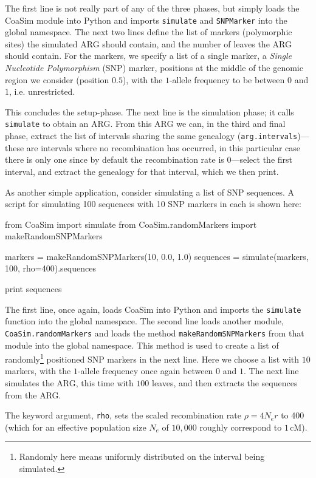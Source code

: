 \documentclass{manual}
\newcommand{\cM}{\mathrm{cM}}
\begin{document}
The first line is not really part of any of the three phases, but
simply loads the CoaSim module into Python and imports
\texttt{simulate} and \texttt{SNPMarker} into the global namespace.
The next two lines define the list of markers (polymorphic sites) the
simulated ARG should contain, and the number of leaves the ARG should
contain.  For the markers, we specify a list of a single marker, a
\emph{Single Nucleotide Polymorphism} (SNP) marker, positions at the
middle of the genomic region we consider (position $0.5$), with the
$1$-allele frequency to be between $0$ and $1$, i.e. unrestricted.

This concludes the setup-phase.  The next line is the simulation
phase; it calls \texttt{simulate} to obtain an ARG.  From this ARG we
can, in the third and final phase, extract the list of intervals
sharing the same genealogy (\texttt{arg.intervals})---these are
intervals where no recombination has occurred, in this particular case
there is only one since by default the recombination rate is
$0$---select the first interval, and extract the genealogy for that
interval, which we then print.

As another simple application, consider simulating a list of SNP
sequences.  A script for simulating 100 sequences with 10 SNP markers
in each is shown here:
\begin{code}
from CoaSim import simulate
from CoaSim.randomMarkers import makeRandomSNPMarkers

markers = makeRandomSNPMarkers(10, 0.0, 1.0)
sequences = simulate(markers, 100, rho=400).sequences

print sequences
\end{code}

The first line, once again, loads CoaSim into Python and imports the
\texttt{simulate} function into the global namespace.  The second line
loads another module, \texttt{CoaSim.randomMarkers} and loads the
method \texttt{makeRandomSNPMarkers} from that module into the global
namespace.  This method is used to create a list of
randomly\footnote{Randomly here means uniformly distributed on the
  interval being simulated.} positioned SNP markers in the next line.
Here we choose a list with $10$ markers, with the $1$-allele frequency
once again between $0$ and $1$.  The next line simulates the ARG, this
time with $100$ leaves, and then extracts the sequences from the ARG.

The keyword argument, \texttt{rho}, sets the scaled recombination rate
$\rho=4N_er$ to 400 (which for an effective population size $N_e$ of
$10,000$ roughly correspond to $1\,\cM$).
\end{document}
